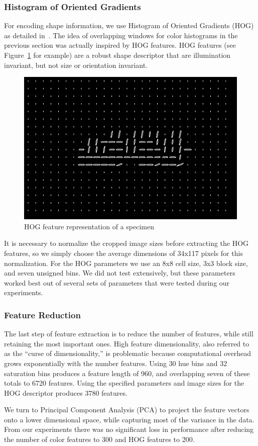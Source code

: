 \documentclass[a4paper,12pt]{article}
\begin{document}
\subsubsection{Histogram of Oriented Gradients}
For encoding shape information, we use Histogram of Oriented Gradients (HOG) as detailed in~\cite{hog:article}. The idea of overlapping windows for color histograms in the previous section was actually inspired by HOG features. HOG features (see Figure~\ref{fig:hog-example} for example) are a robust shape descriptor that are illumination invariant, but not size or orientation invariant.
 \begin{figure}
	\includegraphics[width=.25\textwidth]{hs/hog}
	\caption{HOG feature representation of a specimen}
	\label{fig:hog-example}
\end{figure}
It is necessary to normalize the cropped image sizes before extracting the HOG features, so we simply choose the average dimensions of 34x117 pixels for this normalization. For the HOG parameters we use an 8x8 cell size, 3x3 block size, and seven unsigned bins. We did not test extensively, but these parameters worked best out of several sets of parameters that were tested during our experiments.

\subsubsection{Feature Reduction}
The last step of feature extraction is to reduce the number of features, while still retaining the most important ones. High feature dimensionality, also referred to as the ``curse of dimensionality,'' is problematic because computational overhead grows exponentially with the number features. Using 30 hue bins and 32 saturation bins produces a feature length of 960, and overlapping seven of these totals to 6720 features. Using the specified parameters and image sizes for the HOG descriptor produces 3780 features. 

We turn to Principal Component Analysis (PCA) to project the feature vectors onto a lower dimensional space, while capturing most of the variance in the data. From our experiments there was no significant loss in performance after reducing the number of color features to 300 and HOG features to 200.
\end{document}
